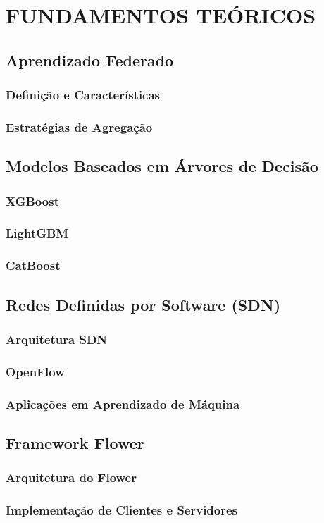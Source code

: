 \section{FUNDAMENTOS TEÓRICOS}

\subsection{Aprendizado Federado}

\subsubsection{Definição e Características}

\subsubsection{Estratégias de Agregação}

\subsection{Modelos Baseados em Árvores de Decisão}

\subsubsection{XGBoost}

\subsubsection{LightGBM}

\subsubsection{CatBoost}

\subsection{Redes Definidas por Software (SDN)}

\subsubsection{Arquitetura SDN}

\subsubsection{OpenFlow}

\subsubsection{Aplicações em Aprendizado de Máquina}

\subsection{Framework Flower}

\subsubsection{Arquitetura do Flower}

\subsubsection{Implementação de Clientes e Servidores}
